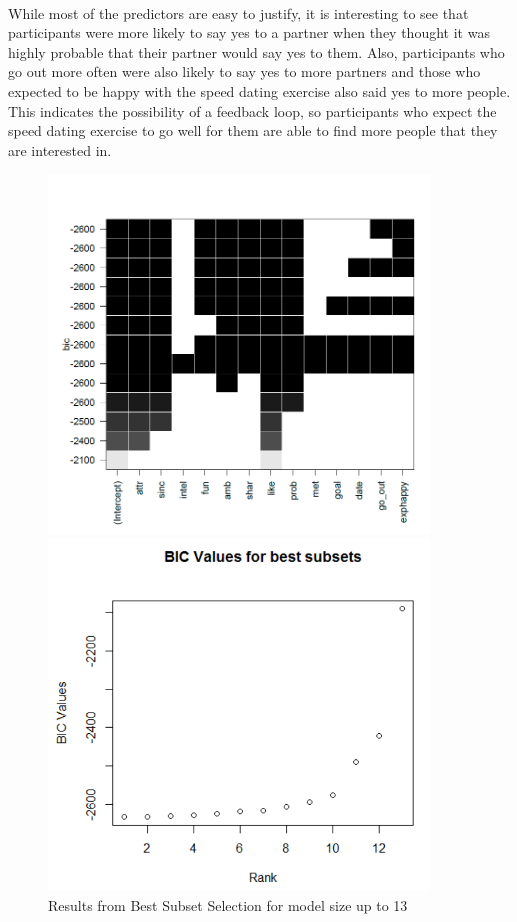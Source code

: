\documentclass{article}
\begin{document}
\null\\
While most of the predictors are easy to justify, it is interesting to see that participants were more likely to say yes to a partner when they thought it was highly probable that their partner would say yes to them. Also, participants who go out more often were also likely to say yes to more partners and those who expected to be happy with the speed dating exercise also said yes to more people. This indicates the possibility of a feedback loop, so participants who expect the speed dating exercise to go well for them are able to find more people that they are interested in.
\begin{figure}[H]
	\centering
	\begin{minipage}{0.45\textwidth}
		\centering
		\includegraphics[width=0.9\textwidth]{bestsubsets} %
		\caption{Results from Best Subset Selection for model size up to 13}
		\label{fig:bestsubsets}
	\end{minipage}\hfill
	\begin{minipage}{0.45\textwidth}
		\centering
		\includegraphics[width=0.9\textwidth]{BIC_sort} %

\end{minipage}
\end{figure}
\end{document}

